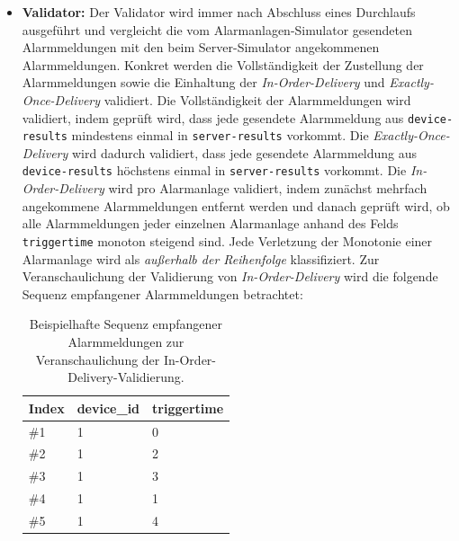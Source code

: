 \begin{itemize}
	      \newpage

	\item \textbf{Validator:} Der Validator wird immer nach Abschluss eines Durchlaufs ausgeführt und vergleicht die vom Alarmanlagen-Simulator gesendeten Alarmmeldungen mit den beim Server-Simulator angekommenen Alarmmeldungen. Konkret werden die Vollständigkeit der Zustellung der Alarmmeldungen sowie die Einhaltung der \textit{In-Order-Delivery} und \textit{Exactly-Once-Delivery} validiert. Die Vollständigkeit der Alarmmeldungen wird validiert, indem geprüft wird, dass jede gesendete Alarmmeldung aus \texttt{device-\allowbreak results} mindestens einmal in \texttt{server-\allowbreak results} vorkommt. Die \textit{Exactly-Once-Delivery} wird dadurch validiert, dass jede gesendete Alarmmeldung aus \texttt{device-\allowbreak results} höchstens einmal in \texttt{server-\allowbreak results} vorkommt. Die \textit{In-Order-Delivery} wird pro Alarmanlage validiert, indem zunächst mehrfach angekommene Alarmmeldungen entfernt werden und danach geprüft wird, ob alle Alarmmeldungen jeder einzelnen Alarmanlage anhand des Felds \texttt{triggertime} monoton steigend sind. Jede Verletzung der Monotonie einer Alarmanlage wird als \textit{außerhalb der Reihenfolge} klassifiziert. Zur Veranschaulichung der Validierung von \textit{In-Order-Delivery} wird die folgende Sequenz empfangener Alarmmeldungen betrachtet:

	      \begin{table}[H]
		      \centering
		      \begin{tabular}{|l|l|l|}
			      \hline
			      \textbf{Index} & \textbf{device\_id} & \textbf{triggertime} \\
			      \hline
			      \#1            & 1                   & 0                    \\
			      \#2            & 1                   & 2                    \\
			      \#3            & 1                   & 3                    \\
			      \#4            & 1                   & 1                    \\
			      \#5            & 1                   & 4                    \\
			      \hline
		      \end{tabular}
		      \caption{Beispielhafte Sequenz empfangener Alarmmeldungen zur Veranschaulichung der In-Order-Delivery-Validierung.}
		      \label{tab:in-order-delivery-seq-beispiel}
	      \end{table}


\end{itemize}
